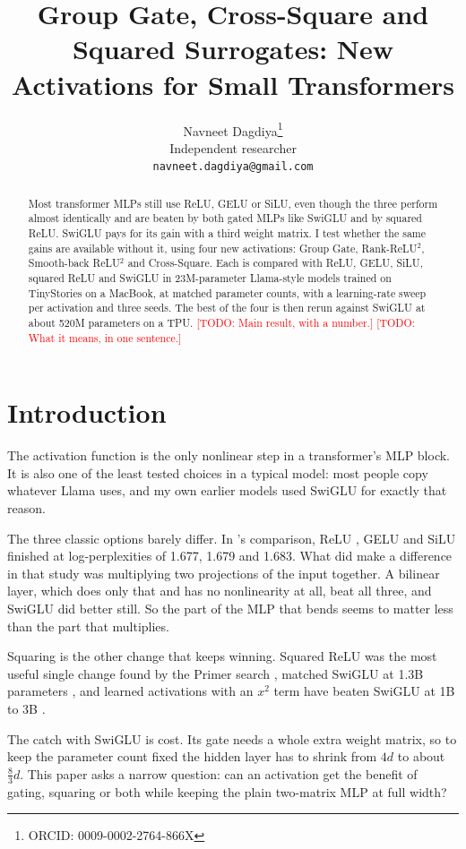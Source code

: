 \documentclass{article}
\title{Group Gate, Cross-Square and Squared Surrogates: New Activations for Small Transformers}
\author{%
  Navneet Dagdiya\thanks{ORCID: 0009-0002-2764-866X} \\
  Independent researcher \\
  \texttt{navneet.dagdiya@gmail.com} \\
}
\newcommand{\todo}[1]{\textcolor{red}{[TODO: #1]}}
\begin{document}
\maketitle

\begin{abstract}
Most transformer MLPs still use ReLU, GELU or SiLU, even though the three perform almost identically and are beaten by both gated MLPs like SwiGLU and by squared ReLU.
SwiGLU pays for its gain with a third weight matrix.
I test whether the same gains are available without it, using four new activations: Group Gate, Rank-ReLU$^2$, Smooth-back ReLU$^2$ and Cross-Square.
Each is compared with ReLU, GELU, SiLU, squared ReLU and SwiGLU in 23M-parameter Llama-style models trained on TinyStories on a MacBook, at matched parameter counts, with a learning-rate sweep per activation and three seeds.
The best of the four is then rerun against SwiGLU at about 520M parameters on a TPU.
\todo{Main result, with a number.}
\todo{What it means, in one sentence.}
\end{abstract}

\section{Introduction}
\label{sec:intro}

The activation function is the only nonlinear step in a transformer's MLP block.
It is also one of the least tested choices in a typical model: most people copy whatever Llama uses, and my own earlier models used SwiGLU for exactly that reason.

The three classic options barely differ.
In \citet{shazeer2020glu}'s comparison, ReLU \citep{nair2010relu}, GELU \citep{hendrycks2016gelu} and SiLU \citep{elfwing2018silu,ramachandran2017swish} finished at log-perplexities of 1.677, 1.679 and 1.683.
What did make a difference in that study was multiplying two projections of the input together.
A bilinear layer, which does only that and has no nonlinearity at all, beat all three, and SwiGLU did better still.
So the part of the MLP that bends seems to matter less than the part that multiplies.

Squaring is the other change that keeps winning.
Squared ReLU was the most useful single change found by the Primer search \citep{so2021primer}, matched SwiGLU at 1.3B parameters \citep{zhang2024relu2}, and learned activations with an $x^2$ term have beaten SwiGLU at 1B to 3B \citep{huang2024xielu,zhuo2024polycom}.

The catch with SwiGLU is cost.
Its gate needs a whole extra weight matrix, so to keep the parameter count fixed the hidden layer has to shrink from $4d$ to about $\tfrac{8}{3}d$.
This paper asks a narrow question: can an activation get the benefit of gating, squaring or both while keeping the plain two-matrix MLP at full width?
\end{document}
